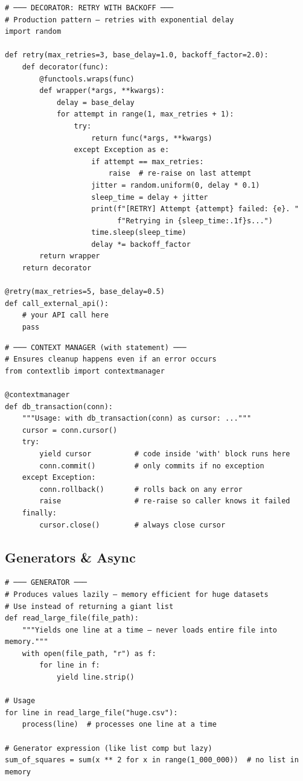 \documentclass[10pt, a4paper]{article}
\begin{document}
\begin{lstlisting}[language=mypython]
# ─── DECORATOR: RETRY WITH BACKOFF ───
# Production pattern — retries with exponential delay
import random

def retry(max_retries=3, base_delay=1.0, backoff_factor=2.0):
    def decorator(func):
        @functools.wraps(func)
        def wrapper(*args, **kwargs):
            delay = base_delay
            for attempt in range(1, max_retries + 1):
                try:
                    return func(*args, **kwargs)
                except Exception as e:
                    if attempt == max_retries:
                        raise  # re-raise on last attempt
                    jitter = random.uniform(0, delay * 0.1)
                    sleep_time = delay + jitter
                    print(f"[RETRY] Attempt {attempt} failed: {e}. "
                          f"Retrying in {sleep_time:.1f}s...")
                    time.sleep(sleep_time)
                    delay *= backoff_factor
        return wrapper
    return decorator

@retry(max_retries=5, base_delay=0.5)
def call_external_api():
    # your API call here
    pass
\end{lstlisting}


\begin{lstlisting}[language=mypython]
# ─── CONTEXT MANAGER (with statement) ───
# Ensures cleanup happens even if an error occurs
from contextlib import contextmanager

@contextmanager
def db_transaction(conn):
    """Usage: with db_transaction(conn) as cursor: ..."""
    cursor = conn.cursor()
    try:
        yield cursor          # code inside 'with' block runs here
        conn.commit()         # only commits if no exception
    except Exception:
        conn.rollback()       # rolls back on any error
        raise                 # re-raise so caller knows it failed
    finally:
        cursor.close()        # always close cursor
\end{lstlisting}


\subsection{Generators \& Async}


\begin{lstlisting}[language=mypython]
# ─── GENERATOR ───
# Produces values lazily — memory efficient for huge datasets
# Use instead of returning a giant list
def read_large_file(file_path):
    """Yields one line at a time — never loads entire file into memory."""
    with open(file_path, "r") as f:
        for line in f:
            yield line.strip()

# Usage
for line in read_large_file("huge.csv"):
    process(line)  # processes one line at a time

# Generator expression (like list comp but lazy)
sum_of_squares = sum(x ** 2 for x in range(1_000_000))  # no list in memory
\end{lstlisting}
\end{document}
